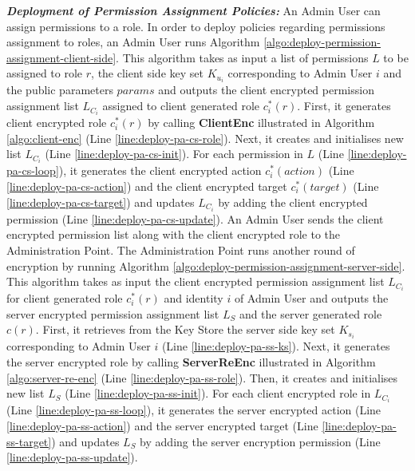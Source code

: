 \documentclass[final,5p,times,twocolumn]{elsarticle}
\begin{document}
\emph{\textbf{Deployment of Permission Assignment Policies:}} 
An Admin User can assign permissions to a role. In order to deploy policies regarding permissions assignment to roles, an Admin User runs Algorithm \ref{algo:deploy-permission-assignment-client-side}. This algorithm takes as input a list of permissions $L$ to be assigned to role $r$, the client side key set $K_{u_i}$ corresponding to Admin User $i$ and the public parameters $params$ and outputs the client encrypted permission assignment list $L_{C_i}$ assigned to client generated role $c^*_i (r)$. First, it generates client encrypted role $c^*_i (r)$ by calling \textbf{ClientEnc} illustrated in Algorithm \ref{algo:client-enc} (Line \ref{line:deploy-pa-cs-role}). Next, it creates and initialises new list $L_{C_i}$ (Line \ref{line:deploy-pa-cs-init}). For each permission in $L$ (Line \ref{line:deploy-pa-cs-loop}), it generates the client encrypted action $c^*_i (action)$ (Line \ref{line:deploy-pa-cs-action}) and the client encrypted target $c^*_i (target)$ (Line \ref{line:deploy-pa-cs-target}) and updates $L_{C_i}$ by adding the client encrypted permission (Line \ref{line:deploy-pa-cs-update}). An Admin User sends the client encrypted permission list along with the client encrypted role to the Administration Point. 
The Administration Point runs another round of encryption by running Algorithm \ref{algo:deploy-permission-assignment-server-side}. This algorithm takes as input the client encrypted permission assignment list $L_{C_i}$ for client generated role $c^*_i (r)$ and identity $i$ of Admin User and outputs the server encrypted permission assignment list $L_{S}$ and the server generated role $c(r)$. First, it retrieves from the Key Store the server side key set $K_{s_i}$ corresponding to Admin User $i$ (Line \ref{line:deploy-pa-ss-ks}). Next, it generates the server encrypted role by calling \textbf{ServerReEnc} illustrated in Algorithm \ref{algo:server-re-enc} (Line \ref{line:deploy-pa-ss-role}). Then, it creates and initialises new list $L_{S}$ (Line \ref{line:deploy-pa-ss-init}). For each client encrypted role in $L_{C_i}$ (Line \ref{line:deploy-pa-ss-loop}), it generates the server encrypted action (Line \ref{line:deploy-pa-ss-action}) and the server encrypted target (Line \ref{line:deploy-pa-ss-target}) and updates $L_{S}$ by adding the server encryption permission (Line \ref{line:deploy-pa-ss-update}).
\end{document}
